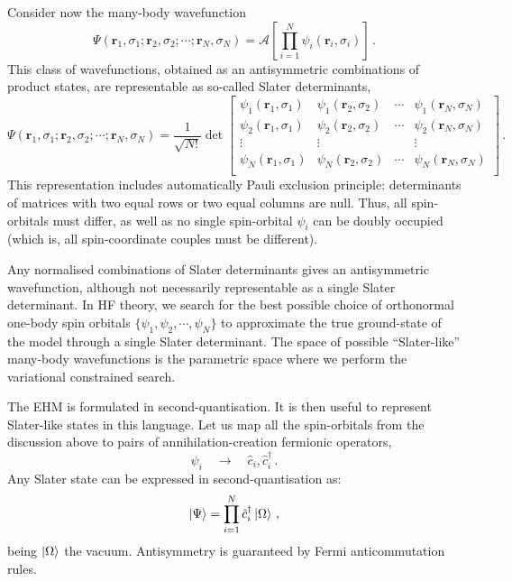 Consider now the many-body wavefunction
\[
	\Psi(\mathbf{r}_1,\sigma_1;\mathbf{r}_2,\sigma_2;\cdots;\mathbf{r}_N,\sigma_N) = \mathcal{A} \left[
	\prod_{i=1}^{N} \psi_i(\mathbf{r}_i,\sigma_i)
	\right] \, .
\]
This class of wavefunctions, obtained as an antisymmetric combinations of product states, are representable as so-called Slater determinants,
\[
	\Psi(\mathbf{r}_1,\sigma_1;\mathbf{r}_2,\sigma_2;\cdots;\mathbf{r}_N,\sigma_N) = \frac{1}{\sqrt{N!}} \det \begin{bmatrix}
		\psi_1 (\mathbf{r}_1,\sigma_1) & \psi_1 (\mathbf{r}_2,\sigma_2) & \cdots & \psi_1 (\mathbf{r}_N,\sigma_N) \\
		\psi_2 (\mathbf{r}_1,\sigma_1) & \psi_2 (\mathbf{r}_2,\sigma_2) & \cdots & \psi_2 (\mathbf{r}_N,\sigma_N) \\
		\vdots & \vdots & & \vdots \\
		\psi_N (\mathbf{r}_1,\sigma_1) & \psi_N (\mathbf{r}_2,\sigma_2) & \cdots & \psi_N (\mathbf{r}_N,\sigma_N) \\
	\end{bmatrix} \, .
\]
This representation includes automatically Pauli exclusion principle: determinants of matrices with two equal rows or two equal columns are null. Thus, all spin-orbitals must differ, as well as no single spin-orbital $\psi_i$ can be doubly occupied (which is, all spin-coordinate couples must be different).

Any normalised combinations of Slater determinants gives an antisymmetric wavefunction, although not necessarily representable as a single Slater determinant. In HF theory, we search for the best possible choice of orthonormal one-body spin orbitals $\lbrace \psi_1,\psi_2, \cdots, \psi_N \rbrace$ to approximate the true ground-state of the model through a single Slater determinant. The space of possible ``Slater-like'' many-body wavefunctions is the parametric space where we perform the variational constrained search.

The EHM is formulated in second-quantisation. It is then useful to represent Slater-like states in this language. Let us map all the spin-orbitals from the discussion above to pairs of annihilation-creation fermionic operators,
\[
	\psi_i \quad\to\quad \hat c_i, \hat c_i^\dagger \, .
\]
Any Slater state can be expressed in second-quantisation as:
\begin{equation}\label{appeq:slater-Psi}
	\ket{\Psi} = \prod_{i=1}^N \hat c_i^\dagger \ket{\Omega} \, ,
\end{equation}
being $\ket{\Omega}$ the vacuum. Antisymmetry is guaranteed by Fermi anticommutation rules.

